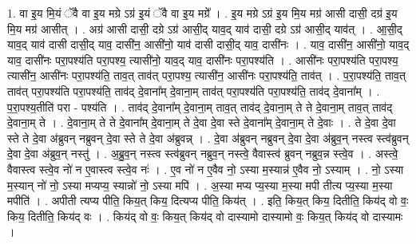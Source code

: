 \documentclass[17pt]{extarticle}
\begin{document}
1. वा इ॒य मि॒यं ॅवै वा इ॒य मग्रे ऽग्र॑ इ॒यं ॅवै वा इ॒य मग्रे᳚ । . इ॒य मग्रे ऽग्र॑ इ॒य मि॒य मग्र॑ आसी दासी॒ दग्र॑ इ॒य मि॒य मग्र॑ आसीत् । . अग्र॑ आसी दासी॒ दग्रे ऽग्र॑ आसी॒द् याव॒द् याव॑ दासी॒ दग्रे ऽग्र॑ आसी॒द् याव॑त् । . आ॒सी॒द् याव॒द् याव॑ दासी दासी॒द् याव॒ दासी॑न॒ आसी॑नो॒ याव॑ दासी दासी॒द् याव॒ दासी॑नः । . याव॒ दासी॑न॒ आसी॑नो॒ याव॒द् याव॒ दासी॑नः परा॒पश्य॑ति परा॒पश्य॒ त्यासी॑नो॒ याव॒द् याव॒ दासी॑नः परा॒पश्य॑ति । . आसी॑नः परा॒पश्य॑ति परा॒पश्य॒ त्यासी॑न॒ आसी॑नः परा॒पश्य॑ति॒ ताव॒त् ताव॑त् परा॒पश्य॒ त्यासी॑न॒ आसी॑नः परा॒पश्य॑ति॒ ताव॑त् । . प॒रा॒पश्य॑ति॒ ताव॒त् ताव॑त् परा॒पश्य॑ति परा॒पश्य॑ति॒ ताव॑द् दे॒वाना᳚म् दे॒वाना॒म् ताव॑त् परा॒पश्य॑ति परा॒पश्य॑ति॒ ताव॑द् दे॒वाना᳚म् । . प॒रा॒पश्य॒तीति॑ परा - पश्य॑ति । . ताव॑द् दे॒वाना᳚म् दे॒वाना॒म् ताव॒त् ताव॑द् दे॒वाना॒म् ते ते दे॒वाना॒म् ताव॒त् ताव॑द् दे॒वाना॒म् ते । . दे॒वाना॒म् ते ते दे॒वाना᳚म् दे॒वाना॒म् ते दे॒वा दे॒वा स्ते दे॒वाना᳚म् दे॒वाना॒म् ते दे॒वाः । . ते दे॒वा दे॒वा स्ते ते दे॒वा अ॑ब्रुवन् नब्रुवन् दे॒वा स्ते ते दे॒वा अ॑ब्रुवन्न् । . दे॒वा अ॑ब्रुवन् नब्रुवन् दे॒वा दे॒वा अ॑ब्रुव॒न् नस्त्व स्त्व॑ब्रुवन् दे॒वा दे॒वा अ॑ब्रुव॒न् नस्तु॑ । . अ॒ब्रु॒व॒न् नस्त्व स्त्व॑ब्रुवन् नब्रुव॒न् नस्त्वे॒ वैवास्त्व॑ ब्रुवन् नब्रुव॒न्न स्त्वे॒व । . अस्त्वे॒ वैवास्त्व स्त्वे॒व नो॑ न ए॒वास्त्व स्त्वे॒व नः॑ । . ए॒व नो॑ न ए॒वैव नो॒ ऽस्या म॒स्यान्न॑ ए॒वैव नो॒ ऽस्याम् । . नो॒ ऽस्या म॒स्यान् नो॑ नो॒ ऽस्या मप्यप्य॒ स्यान्नो॑ नो॒ ऽस्या मपि॑ । . अ॒स्या मप्य प्य॒स्या म॒स्या मपी तीत्य प्य॒स्या म॒स्या मपीति॑ । . अपीती त्यप्य पीति॒ किय॒त् किय॒ दित्यप्य पीति॒ किय॑त् । . इति॒ किय॒त् किय॒ दितीति॒ किय॑द् वो वः॒ किय॒ दितीति॒ किय॑द् वः । . किय॑द् वो वः॒ किय॒त् किय॑द् वो दास्यामो दास्यामो वः॒ किय॒त् किय॑द् वो दास्यामः । \newline
\end{document}
